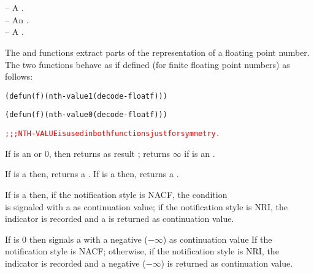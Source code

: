 \documentclass[../Comparisons-Predicates.tex]{subfiles}
\begin{document}
  
  \DSyntax{}
  
    \RArrow{} \\
    \RArrow{} \\
  
  
  \DArgsNValues{}
  
   -- A .\\
   -- An .\\
   -- A .
  
  \DDescription{}
  
  The  and  functions extract parts of the
  representation of a floating point number.  The two functions behave
  as if defined (for finite floating point numbers) as follows:
  
  \begin{alltt}
    (defun  (f) (nth-value 1 (decode-float f)))
    
    (defun  (f) (nth-value 0 (decode-float f)))
    
    \textcolor{red}{;;; NTH-VALUE is used in both functions just for symmetry.}
  \end{alltt}
  
  If  is an  or $0$, then 
  returns  as result ; 
  returns $\infty$ if  is an .
  
  If  is a  then, 
  returns a .  If  is a  then,  returns a .
  
  \DExceptional{}
  
  If  is a  then, if the notification
  style is NACF, the condition\\
   is signaled with a
   as continuation value; if the notification style
  is NRI, the indicator  is recorded and a
   is returned as continuation value.
  
  If  is $0$ then  signals a
   with a negative
   ($-\infty$) as continuation value If the
  notification style is NACF; otherwise, if the notification style is
  NRI, the  indicator is recorded and a negative
   ($-\infty$) is returned as continuation value.
  
\end{document}
